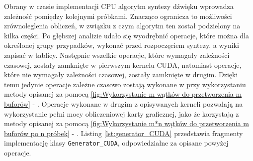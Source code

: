 Obrany w czasie implementacji CPU algorytm syntezy dźwięku wprowadza zależność pomiędzy kolejnymi próbkami. Znacząco ogranicza to możliwości zrównoleglenia obliczeń, w związku z czym algorytm ten został podzielony na kilka części. Po głębszej analizie udało się wyodrębnić operacje, które można dla określonej grupy przypadków, wykonać przed rozpoczęciem syntezy, a wyniki zapisać w tablicy. Następnie wszelkie operacje, które wymagały zależności czasowej, zostały zamknięte w pierwszym kernelu CUDA\cite{bib:CUDA}, natomiast operacje, które nie wymagały zależności czasowej, zostały zamknięte w drugim. Dzięki temu jedynie operacje zależne czasowo zostają wykonane w przy wykorzystaniu metody opisanej za pomocą \ref{fig:Wykorzystanie m wątków do przetworzenia m buforów} - . Operacje wykonane w drugim z opisywanych kerneli pozwalają na wykorzystanie pełni mocy obliczeniowej karty graficznej, jako że korzystają z metody opisanej za pomocą \ref{fig:Wykorzystanie m*n wątków do przetworzenia m buforów po n próbek} - . Listing \ref{lst:generator_CUDA} przedstawia fragmenty implementację klasy \texttt{Generator\_CUDA}, odpowiedzialne za opisane powyżej operacje. 

